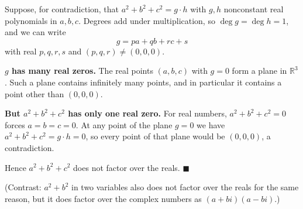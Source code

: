 Suppose, for contradiction, that $a^2+b^2+c^2=g\cdot h$ with $g,h$ nonconstant real polynomials in $a,b,c$. Degrees add under multiplication, so $\deg g=\deg h=1$, and we can write
\[g=pa+qb+rc+s\]
with real $p,q,r,s$ and $(p,q,r)\ne(0,0,0)$.

\textbf{$g$ has many real zeros.} The real points $(a,b,c)$ with $g=0$ form a plane in $\mathbb R^3$. Such a plane contains infinitely many points, and in particular it contains a point other than $(0,0,0)$.

\textbf{But $a^2+b^2+c^2$ has only one real zero.} For real numbers, $a^2+b^2+c^2=0$ forces $a=b=c=0$. At any point of the plane $g=0$ we have $a^2+b^2+c^2=g\cdot h=0$, so every point of that plane would be $(0,0,0)$, a contradiction.

Hence $a^2+b^2+c^2$ does not factor over the reals. $\blacksquare$

(Contrast: $a^2+b^2$ in two variables also does not factor over the reals for the same reason, but it does factor over the complex numbers as $(a+bi)(a-bi)$.)
